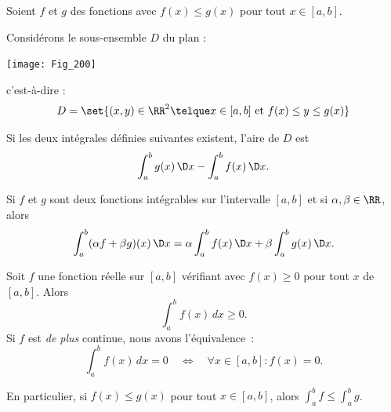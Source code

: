 \begin{frame}
  \begin{proposition}
    Soient \(f\) et \(g\) des fonctions avec \(f(x) \leq g(x)\) pour tout \(x \in [a,b]\).\pause{}

    Considérons le sous-ensemble $D$ du plan :
    \begin{center}
      \texttt{[image: Fig\_200]}
    \end{center}\pause{}
    c'est-à-dire :
    \begin{equation*}
      D= \set{ (x,y) \in \RR^2 \telque x \in [a,b] \mbox{ et } f(x) \leq y \leq g(x) }
    \end{equation*}\pause{}

    Si les deux intégrales définies suivantes existent, l'aire de $D$ est
    \begin{equation*}
      \int_a^b g(x) \, \D x - \int_a^b f(x) \, \D x.
    \end{equation*}
  \end{proposition}
\end{frame}

\begin{frame}
  \begin{proposition}
    Si $f$ et $g$ sont deux fonctions intégrables sur l'intervalle $[a,b]$ et si $\alpha, \beta \in {\RR}$, alors
    \begin{equation*}
      \int_a^b (\alpha f+ \beta g)(x) \, \D x = 
      \alpha \int_a^b f(x) \, \D x + \beta \int_a^b g(x) \, \D x.
    \end{equation*}
  \end{proposition}
\end{frame}

\begin{frame}
  \begin{proposition}
    Soit $f$ une fonction réelle sur $[a,b]$ vérifiant avec $f(x) \geq 0$ pour tout $x$ de $[a,b]$. Alors
    \begin{equation*}
      \int_a^b f(x) \, dx \geq 0.
    \end{equation*}\pause{}
    Si \(f\) est \emph{de plus} continue, nous avons l'équivalence~:\pause{}
    \begin{equation*}
      \int_a^b f(x) \, dx = 0 \quad \iff \quad \forall x \in [a,b] : f(x)=0.
    \end{equation*}
  \end{proposition}

  \begin{corollary}
    En particulier, si \(f(x) \leq g(x)\) pour tout \(x \in [a,b]\), alors \(\int_{a}^{b} f \leq \int_{a}^{b} g\).
  \end{corollary}
\end{frame}


